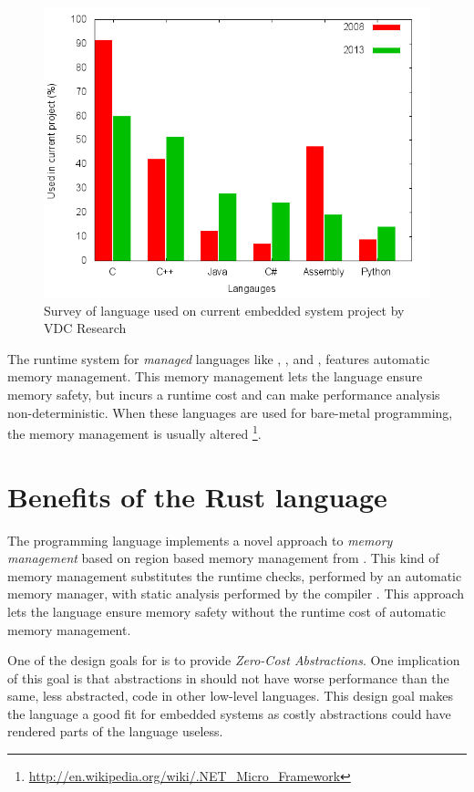 \begin{figure}[H]
  \begin{center}
    \includegraphics[scale=0.5]{figures/plots/langs.png}
  \end{center}
  \caption{Survey of language used on current embedded system project by VDC Research}
  \label{fig:vdc:langs}
\end{figure}

The runtime system for \emph{managed} languages like {\Java}, , and , features automatic memory management.
This memory management lets the language ensure memory safety, but incurs a runtime cost and can make performance analysis non-deterministic.
When these languages are used for bare-metal programming, the memory management is usually altered \cite{PetitBianco} \cite{Pizlo} \footnote{\url{http://en.wikipedia.org/wiki/.NET_Micro_Framework}}.

\section{Benefits of the Rust language}
The {\rust} programming language implements a novel approach to \emph{memory management} based on region based memory management from  \cite{Grossman2002,Swamy2006}.
This kind of memory management substitutes the runtime checks, performed by an automatic memory manager, with static analysis performed by the compiler \cite{Dhurjati2005}.
This approach lets the {\rust} language ensure memory safety without the runtime cost of automatic memory management.

One of the design goals for {\rust} is to provide \emph{Zero-Cost Abstractions}.
One implication of this goal is that abstractions in {\rust} should not have worse performance than the same, less abstracted, code in other low-level languages.
This design goal makes the language a good fit for embedded systems as costly abstractions could have rendered parts of the language useless.

